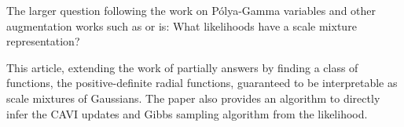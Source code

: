 


\graphicspath{{5/figures/}}

The larger question following the work on P\'olya-Gamma variables and other augmentation works such as \citet{nguyenRobustStudentSt2012} or \citet{henaoBayesianNonlinearSupport2014} is:
What likelihoods have a scale mixture representation?

This article, extending the work of \citet{palmer2006variational} partially answers by finding a class of functions, the positive-definite radial functions, guaranteed to be interpretable as scale mixtures of Gaussians.
The paper also provides an algorithm to directly infer the \ac{CAVI} updates and Gibbs sampling algorithm from the likelihood.

